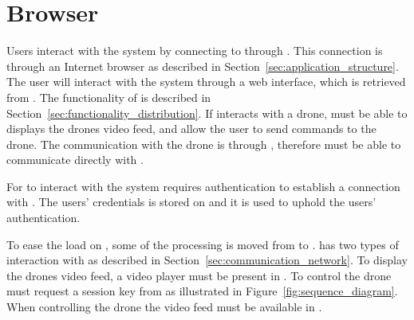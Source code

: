 \section{Browser}
\label{sec:design_client}
Users interact with the system by connecting to  through .
This connection is through an Internet browser as described in Section~\ref{sec:application_structure}.
The user will interact with the system through a web interface, which is retrieved from .
The functionality of  is described in Section~\ref{sec:functionality_distribution}.
If  interacts with a drone,  must be able to displays the drones video feed, and allow the user to send commands to the drone.
The communication with the drone is through , therefore  must be able to communicate directly with .

For  to interact with the system requires authentication to establish a connection with .
The users' credentials is stored on  and it is used to uphold the users' authentication.

To ease the load on , some of the processing is moved from  to .
 has two types of interaction with  as described in Section~\ref{sec:communication_network}.
To display the drones video feed, a video player must be present in .
To control the drone  must request a session key from  as illustrated in Figure~\ref{fig:sequence_diagram}.
When controlling the drone the video feed must be available in .



